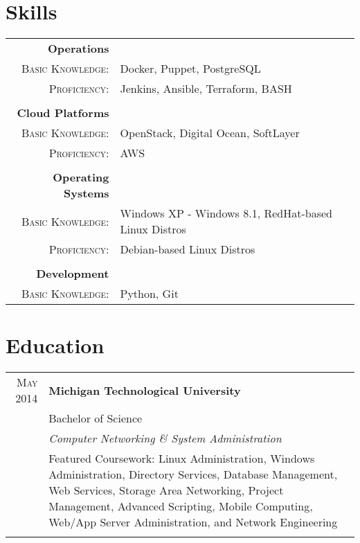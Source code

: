 \documentclass[a4paper,9pt]{extarticle}
\begin{document}
\section{Skills}
\begin{tabular}{rl}
 \textbf{Operations}&\\\textsc{Basic Knowledge:}&\footnotesize{Docker, Puppet, PostgreSQL}\\\textsc{Proficiency:}&\footnotesize{Jenkins, Ansible, Terraform, BASH}\\\multicolumn{2}{c}{}\\
 \textbf{Cloud Platforms}&\\\textsc{Basic Knowledge:}&\footnotesize{OpenStack, Digital Ocean, SoftLayer}\\\textsc{Proficiency:}&\footnotesize{AWS}\\\multicolumn{2}{c}{}\\
 \textbf{Operating Systems}&\\\textsc{Basic Knowledge:}&\footnotesize{Windows XP - Windows 8.1, RedHat-based Linux Distros}\\\textsc{Proficiency:}&\footnotesize{Debian-based Linux Distros}\\\multicolumn{2}{c}{}\\
 \textbf{Development}&\\\textsc{Basic Knowledge:}&\footnotesize{Python, Git}
\end{tabular}

\section{Education}
\begin{tabular}{rp{8.5cm}}
 \textsc{May 2014}&\textbf{Michigan Technological University}\\&Bachelor of Science\\&\emph{Computer Networking \& System Administration}\\&\footnotesize{Featured Coursework: Linux Administration, Windows Administration, Directory Services, Database Management, Web Services, Storage Area Networking, Project Management, Advanced Scripting, Mobile Computing, Web/App Server Administration, and Network Engineering}\\\multicolumn{2}{c}{}\\
\end{tabular}
\end{document}
